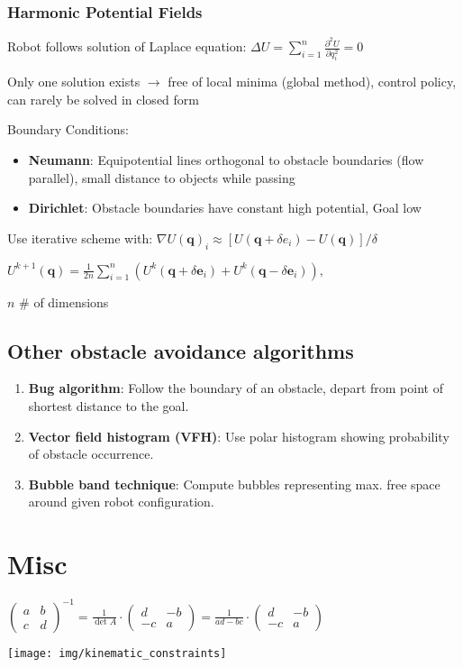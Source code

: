 \documentclass[fontsize=6pt]{scrartcl}
\begin{document}
\begin{multicols*}{4}
\subsubsection*{Harmonic Potential Fields}
Robot follows solution of Laplace equation: $\Delta U = \sum_{i=1}^{n} \frac{\partial^2 U}{\partial q_i^2} = 0$

Only one solution exists $\rightarrow$ free of local minima (global method), control policy, can rarely be solved in closed form

Boundary Conditions:
\begin{itemize}
\item \textbf{Neumann}: Equipotential lines orthogonal to obstacle boundaries (flow parallel), small distance to objects while passing
\item \textbf{Dirichlet}: Obstacle boundaries have constant high potential, Goal low
\end{itemize}

Use iterative scheme with:
$
\nabla U(\mathbf q)_i
\approx
[U(\mathbf q + \delta e_i) - U(\mathbf q)]/\delta
$

{\centering
	$
	U^{k+1}(\mathbf q)
	=
	\frac{1}{2n} \sum_{i=1}^n(U^k(\mathbf q + \delta \mathbf e_i)
	+ U^k(\mathbf q - \delta \mathbf e_i)),
	$
\par }

$n$ \# of dimensions

\subsection*{Other obstacle avoidance algorithms}
\begin{enumerate}
	\item \textbf{Bug algorithm}: Follow the boundary of an obstacle, depart from
	point of shortest distance to the goal.
	\item \textbf{Vector field histogram (VFH)}: Use polar histogram showing
	probability of obstacle occurrence.
	\item \textbf{Bubble band technique}: Compute bubbles representing max.
	free space around given robot configuration.
\end{enumerate}

\section*{Misc}

$\begin{pmatrix} a & b \\ c & d \end{pmatrix}^{-1} = \frac{1}{\det A} \cdot \begin{pmatrix} d & -b \\ -c & a \end{pmatrix} = \frac{1}{ad-bc} \cdot \begin{pmatrix} d & -b \\ -c & a \end{pmatrix}$
{\centering
\texttt{[image: img/kinematic\_constraints]}
\par}


\end{multicols*}
\end{document}
